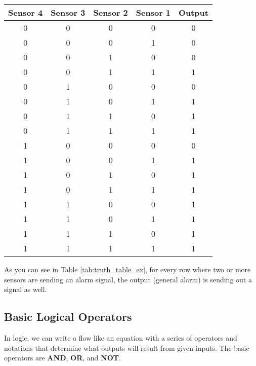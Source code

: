     \begin{table}
        \begin{tabular}[]{c c c c | c}
            \toprule
            Sensor 4 & Sensor 3 & Sensor 2 & Sensor 1 & Output  \\
            \midrule
                0    &    0     &    0     &    0     &    0    \\
                0    &    0     &    0     &    1     &    0    \\
                0    &    0     &    1     &    0     &    0    \\
                0    &    0     &    1     &    1     &    1    \\
                0    &    1     &    0     &    0     &    0    \\
                0    &    1     &    0     &    1     &    1    \\
                0    &    1     &    1     &    0     &    1    \\
                0    &    1     &    1     &    1     &    1    \\
                1    &    0     &    0     &    0     &    0    \\
                1    &    0     &    0     &    1     &    1    \\
                1    &    0     &    1     &    0     &    1    \\
                1    &    0     &    1     &    1     &    1    \\
                1    &    1     &    0     &    0     &    1    \\
                1    &    1     &    0     &    1     &    1    \\
                1    &    1     &    1     &    0     &    1    \\
                1    &    1     &    1     &    1     &    1    \\
            \bottomrule
        \end{tabular}
    \end{table}

    As you can see in Table \ref{tab:truth_table_ex}, for every row where two or more sensors are sending an alarm signal, the output (general alarm) is sending out a signal as well.

    \subsection{Basic Logical Operators}
    In logic, we can write a flow like an equation with a series of operators and notations that determine what outputs will result from given inputs.
    The basic operators are \textbf{AND}, \textbf{OR}, and \textbf{NOT}.
    
